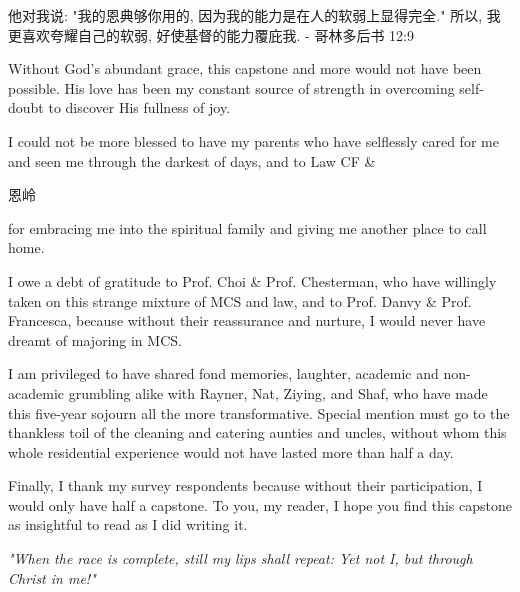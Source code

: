 \documentclass[
hidelinks,
12pt, %
oneside, %
english, %
doublespacing, %
headsepline, %
chapterinoneline, %
]{MastersDoctoralThesis} %
\begin{document}
\begin{acknowledgements}
\addchaptertocentry{\acknowledgementname} %
\begin{CJK*}{UTF8}{gbsn}
	他对我说: "我的恩典够你用的, 因为我的能力是在人的软弱上显得完全." 所以, 我更喜欢夸耀自己的软弱, 好使基督的能力覆庇我. - 哥林多后书 12:9
\end{CJK*}

Without God's abundant grace, this capstone and more would not have been possible. His love has been my constant source of strength in overcoming self-doubt to discover His fullness of joy.

I could not be more blessed to have my parents who have selflessly cared for me and seen me through the darkest of days, and to Law CF \& \begin{CJK*}{UTF8}{gbsn}恩岭\end{CJK*} for embracing me into the spiritual family and giving me another place to call home.

I owe a debt of gratitude to Prof. Choi \& Prof. Chesterman, who have willingly taken on this strange mixture of MCS and law, and to Prof. Danvy \& Prof. Francesca, because without their reassurance and nurture, I would never have dreamt of majoring in MCS.

I am privileged to have shared fond memories, laughter, academic and non-academic grumbling alike with Rayner, Nat, Ziying, and Shaf, who have made this five-year sojourn all the more transformative. Special mention must go to the thankless toil of the cleaning and catering aunties and uncles, without whom this whole residential experience would not have lasted more than half a day.

Finally, I thank my survey respondents because without their participation, I would only have half a capstone. To you, my reader, I hope you find this capstone as insightful to read as I did writing it.

\textit{"When the race is complete, still my lips shall repeat: Yet not I, but through Christ in me!"}
\end{acknowledgements}

\end{document}
